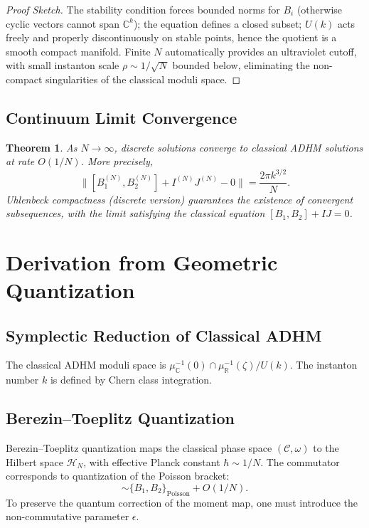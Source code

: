 \documentclass[12pt,a4paper]{amsart}
\theoremstyle{plain}
\newtheorem{theorem}{Theorem}[section]
\theoremstyle{definition}
\theoremstyle{remark}
\begin{document}
\begin{proof}[Proof Sketch]
The stability condition forces bounded norms for $B_i$ (otherwise cyclic vectors cannot span $\mathbb{C}^k$); the equation defines a closed subset; $U(k)$ acts freely and properly discontinuously on stable points, hence the quotient is a smooth compact manifold. Finite $N$ automatically provides an ultraviolet cutoff, with small instanton scale $\rho\sim 1/\sqrt{N}$ bounded below, eliminating the non-compact singularities of the classical moduli space.
\end{proof}

\subsection{Continuum Limit Convergence}

\begin{theorem}\label{thm:limit}
As $N\to\infty$, discrete solutions converge to classical ADHM solutions at rate $O(1/N)$. More precisely,
\begin{equation}
\|[B_1^{(N)},B_2^{(N)}]+I^{(N)}J^{(N)}-0\| = \frac{2\pi k^{3/2}}{N}.
\end{equation}
Uhlenbeck compactness (discrete version) guarantees the existence of convergent subsequences, with the limit satisfying the classical equation $[B_1,B_2]+IJ=0$.
\end{theorem}

\section{Derivation from Geometric Quantization}\label{sec:quantization}

\subsection{Symplectic Reduction of Classical ADHM}

The classical ADHM moduli space is $\mu_{\mathbb{C}}^{-1}(0)\cap\mu_{\mathbb{R}}^{-1}(\zeta)/U(k)$. The instanton number $k$ is defined by Chern class integration.

\subsection{Berezin--Toeplitz Quantization}

Berezin--Toeplitz quantization maps the classical phase space $(\mathcal{C},\omega)$ to the Hilbert space $\mathcal{H}_N$, with effective Planck constant $\hbar\sim 1/N$. The commutator corresponds to quantization of the Poisson bracket:
\begin{equation}
[B_1^{(N)},B_2^{(N)}] \sim \{B_1,B_2\}_{\text{Poisson}} + O(1/N).
\end{equation}
To preserve the quantum correction of the moment map, one must introduce the non-commutative parameter $\epsilon$.
\end{document}
